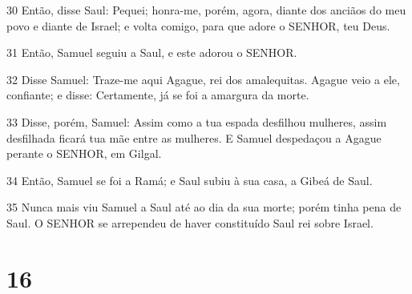 \par 30 Então, disse Saul: Pequei; honra-me, porém, agora, diante dos anciãos do meu povo e diante de Israel; e volta comigo, para que adore o SENHOR, teu Deus.
\par 31 Então, Samuel seguiu a Saul, e este adorou o SENHOR.
\par 32 Disse Samuel: Traze-me aqui Agague, rei dos amalequitas. Agague veio a ele, confiante; e disse: Certamente, já se foi a amargura da morte.
\par 33 Disse, porém, Samuel: Assim como a tua espada desfilhou mulheres, assim desfilhada ficará tua mãe entre as mulheres. E Samuel despedaçou a Agague perante o SENHOR, em Gilgal.
\par 34 Então, Samuel se foi a Ramá; e Saul subiu à sua casa, a Gibeá de Saul.
\par 35 Nunca mais viu Samuel a Saul até ao dia da sua morte; porém tinha pena de Saul. O SENHOR se arrependeu de haver constituído Saul rei sobre Israel.

\chapter{16}

